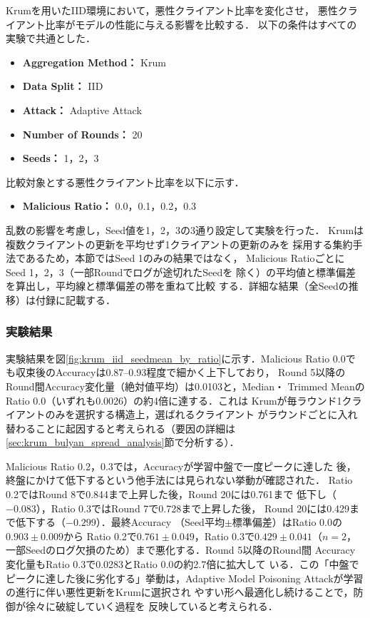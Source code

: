 \documentclass[a4j, twocolumn, dvipdfmx]{jsarticle}  %
\begin{document}
Krumを用いたIID環境において，悪性クライアント比率を変化させ，
悪性クライアント比率がモデルの性能に与える影響を比較する．
以下の条件はすべての実験で共通とした．

\begin{itemize}
    \item \textbf{Aggregation Method：} Krum
    \item \textbf{Data Split：} IID
    \item \textbf{Attack：} Adaptive Attack
    \item \textbf{Number of Rounds：} 20
    \item \textbf{Seeds：} 1，2，3
\end{itemize}

比較対象とする悪性クライアント比率を以下に示す．

\begin{itemize}
    \item \textbf{Malicious Ratio：} 0.0，0.1，0.2，0.3
\end{itemize}

乱数の影響を考慮し，Seed値を1，2，3の3通り設定して実験を行った．
Krumは複数クライアントの更新を平均せず1クライアントの更新のみを
採用する集約手法であるため，本節ではSeed 1のみの結果ではなく，
Malicious Ratioごとに Seed 1，2，3（一部Roundでログが途切れたSeedを
除く）の平均値と標準偏差を算出し，平均線と標準偏差の帯を重ねて比較
する．詳細な結果（全Seedの推移）は付録に記載する．

\subsubsection{実験結果}

実験結果を図\ref{fig:krum_iid_seedmean_by_ratio}に示す．Malicious
Ratio 0.0でも収束後のAccuracyは0.87--0.93程度で細かく上下しており，
Round 5以降のRound間Accuracy変化量（絶対値平均）は0.0103と，Median・
Trimmed MeanのRatio 0.0（いずれも0.0026）の約4倍に達する．これは
Krumが毎ラウンド1クライアントのみを選択する構造上，選ばれるクライアント
がラウンドごとに入れ替わることに起因すると考えられる（要因の詳細は
\ref{sec:krum_bulyan_spread_analysis}節で分析する）．

Malicious Ratio 0.2，0.3では，Accuracyが学習中盤で一度ピークに達した
後，終盤にかけて低下するという他手法には見られない挙動が確認された．
Ratio 0.2ではRound 8で0.844まで上昇した後，Round 20には0.761まで
低下し（$-0.083$），Ratio 0.3ではRound 7で0.728まで上昇した後，
Round 20には0.429まで低下する（$-0.299$）．最終Accuracy
（Seed平均$\pm$標準偏差）はRatio 0.0の$0.903\pm0.009$から
Ratio 0.2で$0.761\pm0.049$，Ratio 0.3で$0.429\pm0.041$（$n=2$，
一部Seedのログ欠損のため）まで悪化する．Round 5以降のRound間
Accuracy変化量もRatio 0.3で0.0283とRatio 0.0の約2.7倍に拡大して
いる．この「中盤でピークに達した後に劣化する」挙動は，Adaptive
Model Poisoning Attackが学習の進行に伴い悪性更新をKrumに選択され
やすい形へ最適化し続けることで，防御が徐々に破綻していく過程を
反映していると考えられる．
\end{document}

